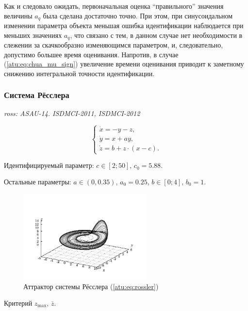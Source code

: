 \documentclass[a4paper,12pt]{article}
\newcommand{\LinkRef}[1]{ \textit{\color{red}#1} }
\begin{document}
Как и следовало ожидать, первоначальная оценка ``правильного'' значения величины $a_q$
была сделана достаточно точно. При этом, при синусоидальном изменении параметра объекта
меньшая ошибка идентификации наблюдается при меньших значениях $a_q$, что связано
с тем, в данном случае нет необходимости в слежении за скачкообразно изменяющимся параметром,
и, следовательно, допустимо большее время оценивания. Напротив, в случае (\ref{atu:eq:chua_mu_sign})
увеличение времени оценивания приводит к заметному снижению интегральной точности идентификации.



\FloatBarrier
\subsubsection{Система Рёсслера} %

\LinkRef{
  ross: ASAU-14. ISDMCI-2011, ISDMCI-2012
}

\begin{equation}
\begin{cases}
  \dot{x}  = -y - z  ,  \\
  \dot{y}  = x + a y ,\\
  \dot{z}  = b + z \cdot ( x-c ) .
\end{cases}
\label{atu:eq:rossler}
\end{equation}

Идентифицируемый параметр:
$ c \in [2; 50] $, $c_0=5.88$.

Остальные параметры:
\( a \in (0, 0.35 ) \), $a_0=0.25$,
\(b \in[0;4] \), $b_0=1$.

\begin{figure}[htb!]
\centerline{\includegraphics[width=0.6\textwidth]{p/cha/ross_phase3.pdf} }
\caption{Аттрактор системы Рёсслера (\ref{atu:eq:rossler})}
\label{atu:f:ross_phase}
\end{figure}

Критерий
$ z_{\max}$, $ \overline{z} $.
\end{document}

